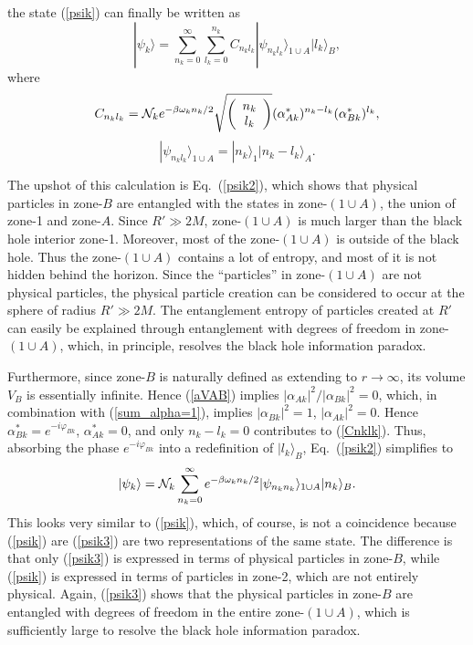 \documentclass[12pt]{article}
\begin{document}
the state (\ref{psik}) can finally be written as 
\begin{equation}\label{psik2}
 |\psi_k\rangle = \sum_{n_k=0}^{\infty} \sum_{l_k=0}^{n_k} C_{n_kl_k} |\psi_{n_kl_k}\rangle_{1\cup A} |l_k\rangle_B ,
\end{equation}
where
\begin{equation}\label{Cnklk}
C_{n_kl_k} = {\cal N}_k e^{-\beta\omega_k n_k/2} \sqrt{\left( \begin{array}{c} n_k \\ l_k \end{array} \right)}
(\alpha_{Ak}^*)^{n_k-l_k} (\alpha_{Bk}^*)^{l_k} ,
\end{equation}
\begin{equation}
 |\psi_{n_kl_k}\rangle_{1\cup A} = |n_k\rangle_1 |n_k-l_k\rangle_A .
\end{equation}

The upshot of this calculation is Eq.~(\ref{psik2}), which shows that physical particles in zone-$B$ are entangled 
with the states in zone-$(1\!\cup\! A)$, the union of zone-1 and zone-$A$. Since $R'\gg 2M$, 
zone-$(1\!\cup\! A)$ is much larger than the black hole interior zone-1. 
Moreover, most of the zone-$(1\!\cup\! A)$ is outside of the black hole.
Thus the zone-$(1\!\cup\! A)$ contains 
a lot of entropy, and most of it is not hidden behind the horizon. 
Since the ``particles'' in zone-$(1\!\cup\! A)$ are not physical particles, the physical particle creation can be considered to 
occur at the sphere of radius $R'\gg 2M$. The entanglement entropy of particles created at $R'$ 
can easily be explained through entanglement with degrees of freedom in zone-$(1\!\cup\! A)$, 
which, in principle, resolves the black hole information paradox.

Furthermore, since zone-$B$ is naturally defined as extending to $r\to \infty$, its volume $V_B$ is essentially infinite.
Hence (\ref{aVAB}) implies $|\alpha_{Ak}|^2/|\alpha_{Bk}|^2=0$, which, in combination with (\ref{sum_alpha=1}), 
implies $|\alpha_{Bk}|^2=1$, $|\alpha_{Ak}|^2=0$. Hence $\alpha_{Bk}^*=e^{-i\varphi_{Bk}}$, $\alpha_{Ak}^*=0$, 
and only $n_k-l_k=0$ contributes to (\ref{Cnklk}). Thus, absorbing the phase $e^{-i\varphi_{Bk}}$ into a redefinition of
$|l_k\rangle_B$, Eq.~(\ref{psik2}) simplifies to
\begin{equation}\label{psik3}
 |\psi_k\rangle = {\cal N}_k \sum_{n_k=0}^{\infty} e^{-\beta\omega_k n_k/2} |\psi_{n_kn_k}\rangle_{1\cup A} |n_k\rangle_B .
\end{equation}
This looks very similar to (\ref{psik}), which, of course, is not a coincidence because 
(\ref{psik}) are (\ref{psik3}) are two representations of the same state.
The difference is that only (\ref{psik3}) is expressed in terms of physical particles in zone-$B$, while  
(\ref{psik}) is expressed in terms of particles in zone-2, which are not entirely physical.
Again, (\ref{psik3}) shows that the physical particles in zone-$B$ are entangled with degrees of freedom
in the entire zone-$(1\!\cup\! A)$, which is sufficiently large to resolve the black hole information paradox.
\end{document}
